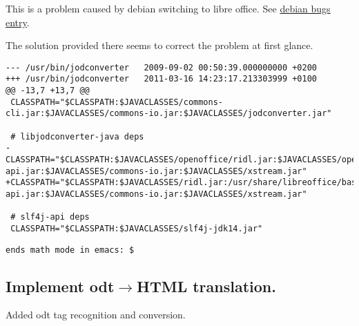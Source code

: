 \documentclass[12pt]{article}
\begin{document}
This is a problem caused by debian switching to libre office.  See
\href{http://bugs.debian.org/cgi-bin/bugreport.cgi?bug=618750}{debian
  bugs entry}.

The solution provided there seems to correct the problem at first glance.

\begin{verbatim}
--- /usr/bin/jodconverter	2009-09-02 00:50:39.000000000 +0200
+++ /usr/bin/jodconverter	2011-03-16 14:23:17.213303999 +0100
@@ -13,7 +13,7 @@
 CLASSPATH="$CLASSPATH:$JAVACLASSES/commons-cli.jar:$JAVACLASSES/commons-io.jar:$JAVACLASSES/jodconverter.jar"
 
 # libjodconverter-java deps
-CLASSPATH="$CLASSPATH:$JAVACLASSES/openoffice/ridl.jar:$JAVACLASSES/openoffice/unoil.jar:$JAVACLASSES/openoffice/juh.jar:$JAVACLASSES/slf4j-api.jar:$JAVACLASSES/commons-io.jar:$JAVACLASSES/xstream.jar"
+CLASSPATH="$CLASSPATH:$JAVACLASSES/ridl.jar:/usr/share/libreoffice/basis3.3/program/classes/unoil.jar:$JAVACLASSES/juh.jar:$JAVACLASSES/slf4j-api.jar:$JAVACLASSES/commons-io.jar:$JAVACLASSES/xstream.jar"
 
 # slf4j-api deps
 CLASSPATH="$CLASSPATH:$JAVACLASSES/slf4j-jdk14.jar"
\end{verbatim}
\begin{verbatim}
ends math mode in emacs: $
\end{verbatim}


\subsection{Implement odt$\rightarrow$HTML translation.}

Added odt tag recognition and conversion.
\end{document}
